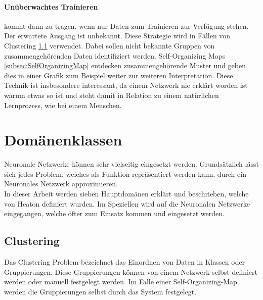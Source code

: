 \paragraph{Unüberwachtes Trainieren} kommt dann zu tragen, wenn nur Daten zum Trainieren zur Verfügung stehen.
Der erwartete Ausgang ist unbekannt.
Diese Strategie wird in Fällen von Clustering \ref{subsec:Clustering} verwendet.
Dabei sollen nicht bekannte Gruppen von zusammengehörenden Daten identifiziert werden. 
Self-Organizing Maps \ref{subsec:SelfOrganizingMap} entdecken zusammengehörende Muster und geben dies in einer Grafik zum Beispiel weiter zur weiteren Interpretation. 
Diese Technik ist insbesondere interessant, da einem Netzwerk nie erklärt worden ist warum etwas so ist und steht damit in Relation zu einem natürlichen Lernprozess, wie bei einem Menschen.

\section{Domänenklassen}
\label{sec:Domänenklassen}

Neuronale Netzwerke können sehr vielseitig eingesetzt werden. 
Grundsätzlich lässt sich jedes Problem, welches als Funktion repräsentiert werden kann, durch ein Neuronales Netzwerk approximieren. \\

\noindent
In dieser Arbeit werden sieben Hauptdomänen erklärt und beschrieben, welche von Heaton \cite{AI3} definiert wurden. %
Im Speziellen wird auf die Neuronalen Netzwerke eingegangen, welche öfter zum Einsatz kommen und eingesetzt werden.

\subsection{Clustering}
\label{subsec:Clustering}

Das Clustering Problem bezeichnet das Einordnen von Daten in Klassen oder Gruppierungen. 
Diese Gruppierungen können von einem Netzwerk selbst definiert werden oder manuell festgelegt werden. 
Im Falle einer Self-Organizing-Map werden die Gruppierungen selbst durch das System festgelegt.


